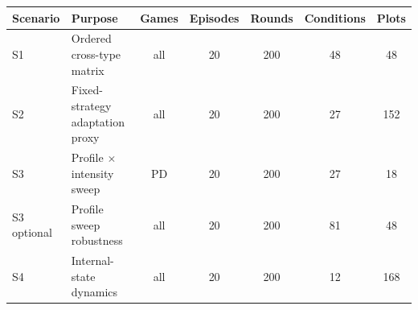 \begin{tabular}{llccccc}
\toprule
Scenario & Purpose & Games & Episodes & Rounds & Conditions & Plots \\
\midrule
S1 & Ordered cross-type matrix & all & 20 & 200 & 48 & 48 \\
S2 & Fixed-strategy adaptation proxy & all & 20 & 200 & 27 & 152 \\
S3 & Profile $\times$ intensity sweep & PD & 20 & 200 & 27 & 18 \\
S3 optional & Profile sweep robustness & all & 20 & 200 & 81 & 48 \\
S4 & Internal-state dynamics & all & 20 & 200 & 12 & 168 \\
\bottomrule
\end{tabular}
